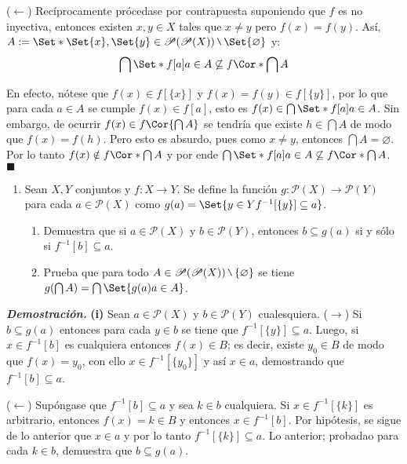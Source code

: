 \documentclass[12pt]{article}
\providecommand\given{}
\renewcommand{\emptyset}{\varnothing}
\newcounter{A}
\newenvironment{ejercicio}{\begin{enumerate}[\bfseries \text{EJ \theA}.]\item}{\end{enumerate}\stepcounter{A}}
\newcommand{\mysetminusD}{\hbox{\tikz{\draw[line width=0.6pt,line cap=round] (3pt,0) -- (0,6pt);}}}
\newcommand{\mysetminusT}{\mysetminusD}
\newcommand{\mysetminusS}{\hbox{\tikz{\draw[line width=0.45pt,line cap=round] (2pt,0) -- (0,4pt);}}}
\newcommand{\mysetminusSS}{\hbox{\tikz{\draw[line width=0.4pt,line cap=round] (1.5pt,0) -- (0,3pt);}}}
\newcommand{\mysetminus}{\mathbin{\mathchoice{\mysetminusD}{\mysetminusT}{\mysetminusS}{\mysetminusSS}}}
\renewcommand{\setminus}{\mysetminus}
\newcommand{\QED}{\hfill\ensuremath{\blacksquare}}
\begin{document}
    (\(\leftarrow\)) Recíprocamente prócedase por contrapuesta suponiendo que \(f\) es no inyectiva, entonces existen \(x,y \in X\) tales que \(x \neq y\) pero \(f(x) = f(y)\). Así, \(A:=\Set*{\Set{x}, \Set{y}} \in \mathscr{P}(\mathscr{P}(X)) \setminus \Set{\emptyset}\) y:
    \[\bigcap \Set*{f[a] \given a \in A} \not\subseteq f \Cor*{\bigcap A} \]

    En efecto, nótese que \(f(x) \in f[\{x\}]\) y \(f(x) = f(y) \in f[\{y\}]\), por lo que para cada \(a \in A \) se cumple \(f(x) \in f[a]\), esto es \(f(x) \in \bigcap \Set*{f[a] \given a \in A}\). Sin embargo, de ocurrir \(f(x) \in f \Cor{\bigcap A}\) se tendría que existe \(h \in \bigcap A\) de modo que \(f(x)=f(h)\). Pero esto es absurdo, pues como \(x \neq y\), entonces \(\bigcap A = \emptyset\). Por lo tanto \(f(x) \notin f \Cor*{\bigcap A}\) y por ende \(\bigcap \Set*{f[a] \given a \in A} \not\subseteq f \Cor*{\bigcap A} \). \QED \\

    \begin{ejercicio}
        Sean $X,Y$ conjuntos y $f:X \to Y$. Se define la función $g:\mathscr{P}(X)\to \mathscr{P}(Y)$ para cada $a \in \mathscr{P}(X)$ como $ g(a)=\Set{ y \in Y \given f^{-1}[\{y\}] \subseteq a } $.
        \begin{enumerate}
            \item Demuestra que si $a \in \mathscr{P}(X)$ y $b \in \mathscr{P}(Y)$, entonces $b \subseteq g(a)$ si y sólo si $f^{-1}[b] \subseteq a$.
            \item Prueba que para todo $A \in \mathscr{P}(\mathscr{P}(X)) \setminus \{\emptyset\}$ se tiene $g(\bigcap A)=\bigcap \Set{g(a) \given a \in A}$.
        \end{enumerate}
    \end{ejercicio}

    \textbf{\textit{Demostración.}} \textbf{(i)} Sean \(a \in \mathscr{P}(X) \) y \(b \in \mathscr{P}(Y)\) cualesquiera.
    (\(\rightarrow\)) Si \(b \subseteq g(a)\) entonces para cada \(y \in b\) se tiene que \(f^{-1}[\{y\}] \subseteq a\). Luego, si \(x \in f^{-1}[b]\) es cualquiera entonces \(f(x) \in B\); es decir, existe \(y_0 \in B\) de modo que \(f(x)=y_0\), con ello \(x \in f^{-1}[\{y_0\}]\) y así \(x \in a\), demostrando que \(f^{-1}[b] \subseteq a\).

    (\(\leftarrow\)) Supóngase que \(f^{-1}[b] \subseteq a\) y sea \(k \in b\) cualquiera. Si \(x \in f^{-1}[\{k\}]\) es arbitrario, entonces \(f(x) = k \in B\) y entonces \(x \in f^{-1}[b]\). Por hipótesis, se sigue de lo anterior que \(x \in a\) y por lo tanto \(f^{-1}[\{k\}] \subseteq a\). Lo anterior; probadao para cada \(k \in b\), demuestra que \(b \subseteq g(a)\). \\
\end{document}
